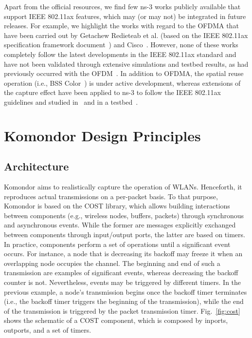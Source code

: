 \documentclass[conference]{IEEEtran}
\begin{document}
	Apart from the official resources, we find few ns-3 works publicly available that support IEEE 802.11ax features, which may (or may not) be integrated in future releases. For example, we highlight the works with regard to the OFDMA that have been carried out by Getachew Redieteab et al. (based on the IEEE 802.11ax specification framework document~\cite{stacey2016specification}) and Cisco~\cite{cisco2017simulator}. However, none of these works completely follow the latest developments in the IEEE 802.11ax standard and have not been validated through extensive simulations and testbed results, as had previously occurred with the OFDM~\cite{pei2010validation}. In addition to OFDMA, the spatial reuse operation (i.e., BSS Color~\cite{7794832_color}) is under active development, whereas extensions of the capture effect have been applied to ns-3 to follow the IEEE 802.11ax guidelines and studied in~\cite{selinis2017exploiting} and in a testbed~\cite{8433688_KhorovCE}.
	
	\section{Komondor Design Principles}
	\label{section:system_model}
	
	\subsection{Architecture}
	\label{subsection:architecture}
	Komondor aims to realistically capture the operation of WLANs. Henceforth, it reproduces actual transmissions on a per-packet basis. To that purpose, Komondor is based on the COST library, which allows building interactions between components (e.g., wireless nodes, buffers, packets) through synchronous and asynchronous events. While the former are messages explicitly exchanged between components through input/output ports, the latter are based on timers.
	In practice, components perform a set of operations until a significant event occurs. For instance, a node that is decreasing its backoff may freeze it when an overlapping node occupies the channel. The beginning and end of such a transmission are examples of significant events, whereas decreasing the backoff counter is not. Nevertheless, events may be triggered by different timers. In the previous example, a node's transmission begins once the backoff timer terminates (i.e., the backoff timer triggers the beginning of the transmission), while the end of the transmission is triggered by the packet transmission timer. Fig.~\ref{fig:cost} shows the schematic of a COST component, which is composed by inports, outports, and a set of timers. 
	
\end{document}
